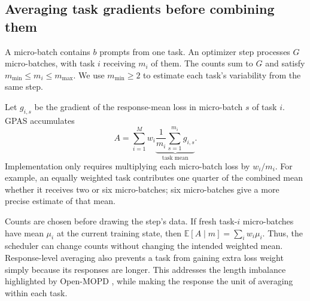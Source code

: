 \subsection{Averaging task gradients before combining them}

A micro-batch contains $b$ prompts from one task. An optimizer step processes
$G$ micro-batches, with task $i$ receiving $m_i$ of them. The counts sum to
$G$ and satisfy $m_{\min}\leq m_i\leq m_{\max}$. We use
$m_{\min}\geq2$ to estimate each task's variability from the same step.

Let $g_{i,s}$ be the gradient of the response-mean loss in micro-batch $s$
of task $i$. GPAS accumulates
\begin{equation}
    A=\sum_{i=1}^M w_i
       \underbrace{\frac1{m_i}\sum_{s=1}^{m_i}g_{i,s}}_{\text{task mean}}.
    \label{eq:batch_gradient_observation}
\end{equation}
Implementation only requires multiplying each micro-batch loss by $w_i/m_i$.
For example, an equally weighted task contributes one quarter of the
combined mean whether it receives two or six micro-batches; six
micro-batches give a more precise estimate of that mean.

Counts are chosen before drawing the step's data. If fresh task-$i$
micro-batches have mean $\mu_i$ at the current training state, then
$\mathbb E[A\mid m]=\sum_iw_i\mu_i$. Thus, the scheduler can change counts
without changing the intended weighted mean. Response-level averaging also
prevents a task from gaining extra loss weight simply because its responses
are longer. This addresses the length imbalance highlighted by Open-MOPD
\citep{gao2026openmopddiagnosingfixingcapability}, while making the response
the unit of averaging within each task.

